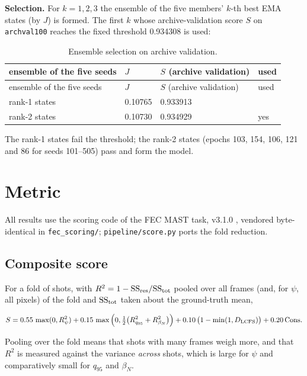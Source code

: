 \documentclass[11pt,a4paper]{article}
\numberwithin{equation}{section}
\begin{document}
\textbf{Selection.} For \(k=1,2,3\) the ensemble of the five members' \(k\)-th best EMA states (by \(J\)) is formed. The first \(k\) whose archive-validation score \(S\) on \texttt{archval100} reaches the fixed threshold 0.934308 is used:

\begin{longtable}[]{@{}llll@{}}
\caption{Ensemble selection on archive validation.}\tabularnewline
\toprule\noalign{}
ensemble of the five seeds & \(J\) & \(S\) (archive validation) & used \\
\midrule\noalign{}
\endfirsthead
\toprule\noalign{}
ensemble of the five seeds & \(J\) & \(S\) (archive validation) & used \\
\midrule\noalign{}
\endhead
\bottomrule\noalign{}
\endlastfoot
rank-1 states & 0.10765 & 0.933913 & \\
rank-2 states & 0.10730 & 0.934929 & yes \\
\end{longtable}

The rank-1 states fail the threshold; the rank-2 states (epochs 103, 154, 106, 121 and 86 for seeds 101--505) pass and form the model.

\hypertarget{metric}{%
\clearpage
\section{Metric}\label{metric}}

All results use the scoring code of the FEC MAST task, v3.1.0 \cite{fec2026starter}, vendored byte-identical in \nolinkurl{fec_scoring/}; \nolinkurl{pipeline/score.py} ports the fold reduction.

\hypertarget{composite-score}{%
\subsection{Composite score}\label{composite-score}}

For a fold of shots, with \(R^2 = 1-\mathrm{SS}_{\rm res}/\mathrm{SS}_{\rm tot}\) pooled over all frames (and, for \(\psi\), all pixels) of the fold and \(\mathrm{SS}_{\rm tot}\) taken about the ground-truth mean,

\begin{equation}
S = 0.55\,\max(0,R^2_\psi) + 0.15\,\max\Big(0,\tfrac12\big(R^2_{q_{95}}+R^2_{\beta_N}\big)\Big)
+ 0.10\,\big(1-\min(1,D_{\rm LCFS})\big) + 0.20\,\mathrm{Cons}.
\label{eq:score}
\end{equation}

Pooling over the fold means that shots with many frames weigh more, and that \(R^2\) is measured against the variance \emph{across} shots, which is large for \(\psi\) and comparatively small for \(q_{95}\) and \(\beta_N\).
\end{document}
